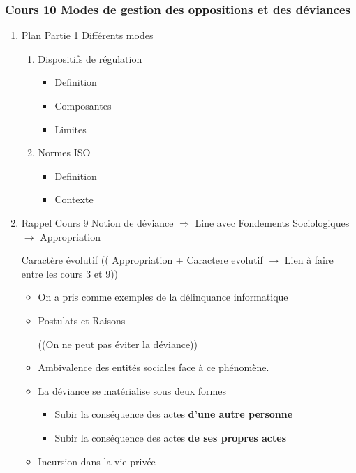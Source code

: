 \documentclass[11pt]{article}
\begin{document}
\subsubsection{Cours 10 Modes de gestion des oppositions et des déviances}
\label{sec:org1088bb8}
\begin{enumerate}
\item Plan
\label{sec:org77637f9}
Partie 1 Différents modes
\begin{enumerate}
\item Dispositifs de régulation
\begin{itemize}
\item Definition
\item Composantes
\item Limites
\end{itemize}
\item Normes ISO
\begin{itemize}
\item Definition
\item Contexte
\end{itemize}
\end{enumerate}
\item Rappel Cours 9
\label{sec:orgd12c7d8}
Notion de déviance \(\Rightarrow\) Line avec Fondements Sociologiques
\(\rightarrow\) Appropriation

Caractère évolutif 
(( Appropriation + Caractere evolutif \(\rightarrow\) Lien à faire entre les cours 3 et 9))
\begin{itemize}
\item On a pris comme exemples de la délinquance informatique

\item Postulats et Raisons

((On ne peut pas éviter la déviance))

\item Ambivalence des entités sociales face à ce phénomène.

\item La déviance se matérialise sous deux formes
\begin{itemize}
\item Subir la conséquence des actes \textbf{d'une autre personne}
\item Subir la conséquence des actes \textbf{de ses propres actes}
\end{itemize}

\item Incursion dans la vie privée
\end{itemize}


\end{enumerate}
\end{document}
